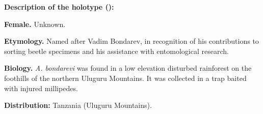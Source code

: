 \documentclass[fleqn,10pt,lineno]{wlpeerj}
\begin{document}

\textbf{Description of the holotype (\male):}


\textbf{Female.} Unknown.

\textbf{Etymology.} Named after Vadim Bondarev, in recognition of his contributions to sorting beetle specimens and his assistance with entomological research.

\textbf{Biology.} \textit{A. bondarevi} was found in a low elevation disturbed rainforest on the foothills of the northern Uluguru Mountains. It was collected in a trap baited with injured millipedes.

\textbf{Distribution:} Tanzania (Uluguru Mountains).
\end{document}
